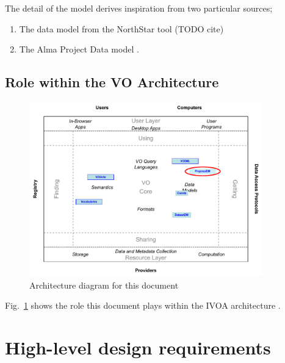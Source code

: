 \documentclass[10pt,a4paper]{ivoa}
\begin{document}
The detail of the model derives inspiration from two particular sources;
\begin{enumerate}
    \item The data model from the NorthStar tool (TODO cite)
    \item The Alma Project Data model \cite{alma:projdm}.
\end{enumerate}


\subsection{Role within the VO Architecture}

\begin{figure}
\centering


\includegraphics[width=0.9\textwidth]{role_diagram.pdf}
\caption{Architecture diagram for this document}
\label{fig:archdiag}
\end{figure}

Fig.~\ref{fig:archdiag} shows the role this document plays within the
IVOA architecture \citep{2010ivoa.rept.1123A}.


\section{High-level design requirements}
\end{document}
